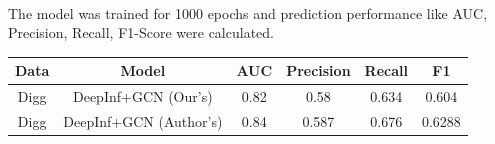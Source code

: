 \paragraph{} The model was trained for 1000 epochs and prediction performance like AUC, Precision, Recall, F1-Score were calculated.
\begin{center}
    \begin{tabular}{ |c|c|c|c|c|c| } 
     \hline
     \textbf{Data} & \textbf{Model} & \textbf{AUC} & \textbf{Precision} & \textbf{Recall} & \textbf{F1} \\ 
     \hline
     Digg & DeepInf+GCN (Our's) & 0.82 & 0.58 & 0.634 & 0.604\\ 
     Digg & DeepInf+GCN (Author's) & 0.84 & 0.587 & 0.676 & 0.6288\\ 
     \hline
    \end{tabular}
    \end{center}
